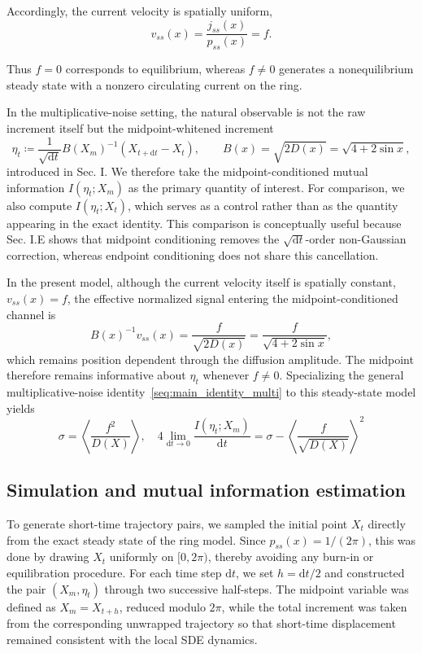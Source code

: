 Accordingly, the current velocity is spatially uniform,
\[
    v_{ss}(x)=\frac{j_{ss}(x)}{p_{ss}(x)}=f.
\]

Thus $f=0$ corresponds to equilibrium, whereas $f\neq0$ generates a nonequilibrium steady state with a nonzero circulating current on the ring.

In the multiplicative-noise setting, the natural observable is not the raw increment itself but the midpoint-whitened increment
\[
    \eta_t\coloneq\frac{1}{\sqrt{\mathrm dt}}B(X_m)^{-1}
    (X_{t+\mathrm dt}-X_t),
    \qquad B(x)=\sqrt{2D(x)}=\sqrt{4+2\sin x},
\]
introduced in Sec. I. We therefore take the midpoint-conditioned mutual information $I(\eta_t;X_m)$ as the primary quantity of interest. For comparison, we also compute $I(\eta_t;X_t)$, which serves as a control rather than as the quantity appearing in the exact identity. This comparison is conceptually useful because Sec. I.E shows that midpoint conditioning removes the $\sqrt{\mathrm dt}$-order non-Gaussian correction, whereas endpoint conditioning does not share this cancellation.

In the present model, although the current velocity itself is spatially constant, $v_{ss}(x)=f$, the effective normalized signal entering the midpoint-conditioned channel is
\[
    B(x)^{-1}v_{ss}(x)=\frac{f}{\sqrt{2D(x)}}
    =\frac{f}{\sqrt{4+2\sin x}},
\]
which remains position dependent through the diffusion amplitude. The midpoint therefore remains informative about $\eta_t$ whenever $f\neq0$. Specializing the general multiplicative-noise identity~\eqref{seq:main_identity_multi} to this steady-state model yields
\[
    \sigma=\left\langle\frac{f^2}{D(X)}\right\rangle,
    \quad4\lim_{\mathrm dt\rightarrow 0}
    \frac{I(\eta_t;X_m)}{\mathrm dt}
    =\sigma-\left\langle\frac{f}{\sqrt{D(X)}}\right\rangle^2
\]

\subsection{Simulation and mutual information estimation}
\vspace*{-0.6\baselineskip}

To generate short-time trajectory pairs, we sampled the initial point $X_t$ directly from the exact steady state of the ring model. Since $p_{ss}(x)=1/(2\pi)$, this was done by drawing $X_t$ uniformly on $[0,2\pi)$, thereby avoiding any burn-in or equilibration procedure. For each time step $\mathrm dt$, we set $h=\mathrm dt/2$ and constructed the pair $(X_m,\eta_t)$ through two successive half-steps. The midpoint variable was defined as $X_m=X_{t+h}$, reduced modulo $2\pi$, while the total increment was taken from the corresponding unwrapped trajectory so that short-time displacement remained consistent with the local SDE dynamics.

